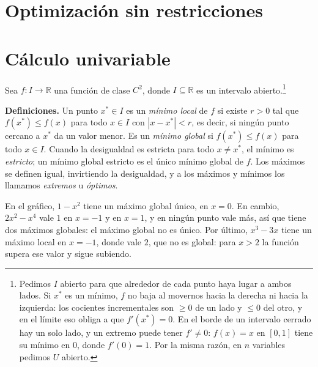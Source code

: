 \documentclass{article}
\newcommand{\R}{\ensuremath{\mathbb{R}}}
\begin{document}
\newpage
\section{Optimización sin restricciones}\label{cap:opt-libre}

\section*{Cálculo univariable}

Sea \(f\colon I\to\R\) una función de clase \(C^2\), donde \(I\subseteq\R\) es un intervalo abierto.\footnote{Pedimos \(I\) abierto para que alrededor de cada punto haya lugar a ambos lados. Si \(x^*\) es un mínimo, \(f\) no baja al movernos hacia la derecha ni hacia la izquierda: los cocientes incrementales son \(\ge0\) de un lado y \(\le0\) del otro, y en el límite eso obliga a que \(f'(x^*)=0\). En el borde de un intervalo cerrado hay un solo lado, y un extremo puede tener \(f'\neq0\): \(f(x)=x\) en \([0,1]\) tiene su mínimo en \(0\), donde \(f'(0)=1\). Por la misma razón, en \(n\) variables pedimos \(U\) abierto.}

\medskip

\noindent\textbf{Definiciones.} Un punto \(x^*\in I\) es un \emph{mínimo local} de \(f\) si existe \(r>0\) tal que \(f(x^*)\le f(x)\) para todo \(x\in I\) con \(|x-x^*|<r\), es decir, si ningún punto cercano a \(x^*\) da un valor menor. Es un \emph{mínimo global} si \(f(x^*)\le f(x)\) para todo \(x\in I\). Cuando la desigualdad es estricta para todo \(x\neq x^*\), el mínimo es \emph{estricto}; un mínimo global estricto es el único mínimo global de \(f\). Los máximos se definen igual, invirtiendo la desigualdad, y a los máximos y mínimos los llamamos \emph{extremos} u \emph{óptimos}.

En el gráfico, \(1-x^2\) tiene un máximo global único, en \(x=0\). En cambio, \(2x^2-x^4\) vale \(1\) en \(x=-1\) y en \(x=1\), y en ningún punto vale más, así que tiene dos máximos globales: el máximo global no es único. Por último, \(x^3-3x\) tiene un máximo local en \(x=-1\), donde vale \(2\), que no es global: para \(x>2\) la función supera ese valor y sigue subiendo.
\end{document}
